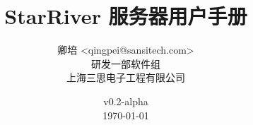 \title{\textbf{StarRiver 服务器用户手册}}

\author{卿培 <qingpei@sansitech.com> \\
        研发一部软件组\\
        上海三思电子工程有限公司
}

\date{\vspace{3em} v0.2-alpha \\\vspace{3em} \today}
